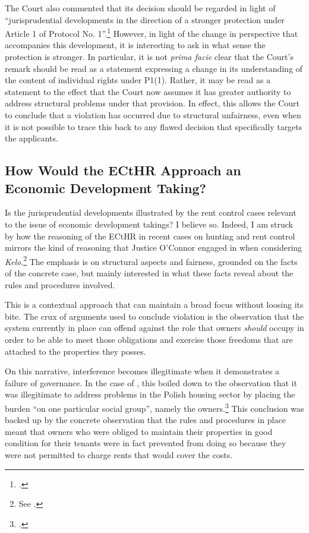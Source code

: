 The Court also commented that its decision should be regarded in light of ``jurisprudential developments in the direction of a stronger protection under Article 1 of Protocol No. 1''.\footcite[135]{lindheim12} However, in light of the change in perspective that accompanies this development, it is interesting to ask in what sense the protection is stronger. In particular, it is not {\it prima facie} clear that the Court's remark should be read as a statement expressing a change in its understanding of the content of individual rights under P1(1). Rather, it may be read  as a statement to the effect that the Court now assumes it has greater authority to address structural problems under that provision. In effect, this allows the Court to conclude that a violation has occurred due to structural unfairness, even when it is not possible to trace this back to any flawed decision that specifically targets the applicants.

\subsection{How Would the ECtHR Approach an Economic Development Taking?}

Is the jurisprudential developments illustrated by the rent control cases relevant to the issue of economic development takings? I believe so. Indeed, I am struck by how the reasoning of the ECtHR in recent cases on hunting and rent control mirrors the kind of reasoning that Justice O'Connor engaged in when considering {\it Kelo}.\footnote{See \cite{kelo05}.} The emphasis is on structural aspects and fairness, grounded on the facts of the concrete case, but mainly interested in what these facts reveal about the rules and procedures involved. 

This is a contextual approach that can maintain a broad focus without loosing its bite. The crux of arguments used to conclude violation is the observation that the system currently in place can offend against the role that owners {\it should} occupy in order to be able to meet those obligations and exercise those freedoms that are attached to the properties they posses.

On this narrative, interference becomes illegitimate when it demonstrates a failure of governance. In the case of \textcite{hutten06}, this boiled down to the observation that it was illegitimate to address problems in the Polish housing sector by placing the burden ``on one particular social group'', namely the owners.\footcite[225]{hutten06} This conclusion was backed up by the concrete observation that the rules and procedures in place meant that owners who were obliged to maintain their properties in good condition for their tenants were in fact prevented from doing so because they were not permitted to charge rents that would cover the costs.


